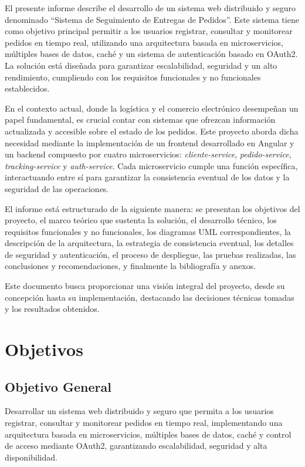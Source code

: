 \documentclass[a4paper,12pt]{article}
\begin{document}
El presente informe describe el desarrollo de un sistema web distribuido y seguro denominado ``Sistema de Seguimiento de Entregas de Pedidos''. Este sistema tiene como objetivo principal permitir a los usuarios registrar, consultar y monitorear pedidos en tiempo real, utilizando una arquitectura basada en microservicios, múltiples bases de datos, caché y un sistema de autenticación basado en OAuth2. La solución está diseñada para garantizar escalabilidad, seguridad y un alto rendimiento, cumpliendo con los requisitos funcionales y no funcionales establecidos.

En el contexto actual, donde la logística y el comercio electrónico desempeñan un papel fundamental, es crucial contar con sistemas que ofrezcan información actualizada y accesible sobre el estado de los pedidos. Este proyecto aborda dicha necesidad mediante la implementación de un frontend desarrollado en Angular y un backend compuesto por cuatro microservicios: \textit{cliente-service}, \textit{pedido-service}, \textit{tracking-service} y \textit{auth-service}. Cada microservicio cumple una función específica, interactuando entre sí para garantizar la consistencia eventual de los datos y la seguridad de las operaciones.

El informe está estructurado de la siguiente manera: se presentan los objetivos del proyecto, el marco teórico que sustenta la solución, el desarrollo técnico, los requisitos funcionales y no funcionales, los diagramas UML correspondientes, la descripción de la arquitectura, la estrategia de consistencia eventual, los detalles de seguridad y autenticación, el proceso de despliegue, las pruebas realizadas, las conclusiones y recomendaciones, y finalmente la bibliografía y anexos.

Este documento busca proporcionar una visión integral del proyecto, desde su concepción hasta su implementación, destacando las decisiones técnicas tomadas y los resultados obtenidos.

\section{Objetivos}

\subsection{Objetivo General}
Desarrollar un sistema web distribuido y seguro que permita a los usuarios registrar, consultar y monitorear pedidos en tiempo real, implementando una arquitectura basada en microservicios, múltiples bases de datos, caché y control de acceso mediante OAuth2, garantizando escalabilidad, seguridad y alta disponibilidad.
\end{document}
